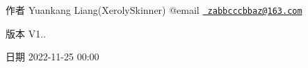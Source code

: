\begin{DoxyAuthor}{作者}
Yuankang Liang(\+Xeroly\+Skinner) @email \href{mailto:zabbcccbbaz@163.com}{\texttt{ zabbcccbbaz@163.\+com}} 
\end{DoxyAuthor}
\begin{DoxyVersion}{版本}
V1.. 
\end{DoxyVersion}
\begin{DoxyDate}{日期}
2022-\/11-\/25 00\+:00 
\end{DoxyDate}
